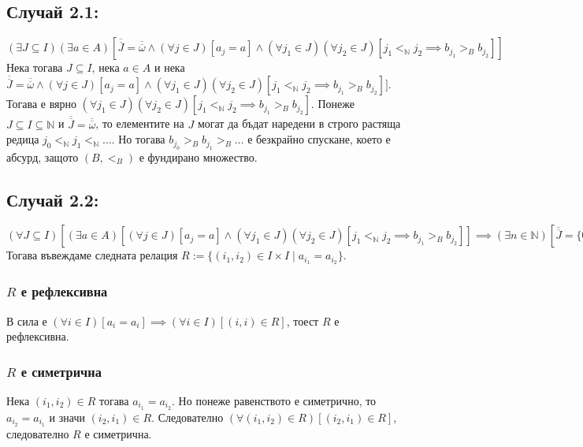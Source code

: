 \documentclass[a4paper, 12pt, oneside]{article}
\begin{document}
\subsection*{Случай 2.1:}
\((\exists J \subseteq I)(\exists a \in A)[\overline{\overline{J}} = \overline{\overline{\omega}} \land (\forall j \in J)[a_j = a] \land (\forall j_1 \in J)(\forall j_2 \in J)[j_1 <_{\mathbb{N}} j_2 \implies b_{j_1} >_B b_{j_2}]]\) \\
Нека тогава \(J \subseteq I\), нека \(a \in A\) и нека \\
\(\overline{\overline{J}} = \overline{\overline{\omega}} \land (\forall j \in J)[a_j = a] \land (\forall j_1 \in J)(\forall j_2 \in J)[j_1 <_{\mathbb{N}} j_2 \implies b_{j_1} >_B b_{j_2}]]\).
Тогава е вярно \((\forall j_1 \in J)(\forall j_2 \in J)[j_1 <_{\mathbb{N}} j_2 \implies b_{j_1} >_B b_{j_2}]\).
Понеже \(J \subseteq I \subseteq \mathbb{N}\) и \(\overline{\overline{J}} = \overline{\overline{\omega}}\),
то елементите на \(J\) могат да бъдат наредени в строго растяща редица \(j_0 <_{\mathbb{N}} j_1  <_{\mathbb{N}} \dots\).
Но тогава \(b_{j_0} >_B b_{j_1} >_B \dots\) е безкрайно спускане, което е абсурд, защото \((B, <_B)\) е фундирано множество.
\subsection*{Случай 2.2:}
\((\forall J \subseteq I)[(\exists a \in A)[(\forall j \in J)[a_j = a] \land (\forall j_1 \in J)(\forall j_2 \in J)[j_1 <_{\mathbb{N}} j_2 \implies b_{j_1} >_B b_{j_2}]] \implies (\exists n \in \mathbb{N})[\overline{\overline{J}} = \overline{\overline{\{0, 1, \dots, n - 1\}}}]]\) \\
Тогава въвеждаме следната релация \(R := \{(i_1, i_2) \in I \times I \; | \; a_{i_1} = a_{i_2}\}\). \\
\subsubsection*{\(R\) е рефлексивна}
В сила е \((\forall i \in I)[a_i = a_i] \implies (\forall i \in I)[(i, i) \in R]\), тоест \(R\) е рефлексивна.
\subsubsection*{\(R\) е симетрична}
Нека \((i_1, i_2) \in R\) тогава \(a_{i_1} = a_{i_2}\). Но понеже равенството е симетрично, то \(a_{i_2} = a_{i_1}\) и значи \((i_2, i_1) \in R\).
Следователно \((\forall (i_1, i_2) \in R)[(i_2, i_1) \in R]\), следователно \(R\) е симетрична.
\end{document}
